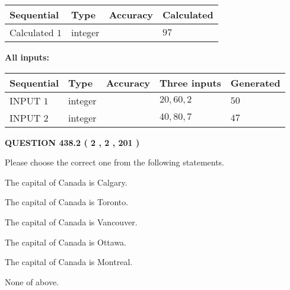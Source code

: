 \documentclass[12pt]{article}
\begin{document}
   
\noindent{}
   
   
  
  
\noindent\begin{tabular}{|l|l|l|l|}
\hline
 Sequential & Type & Accuracy & Calculated \\ 
\hline
 
 
  Calculated $  1 $ & integer &  & 
  $ 97 $ 
 \\  \hline  
 \end{tabular}
   
   
   
   
\noindent\vspace{0.1in}\hspace{-0.08in} {\textbf{\Large{All inputs: }}}
   
   
  
  
\noindent\begin{tabular}{|l|l|l|l|l|}
\hline
 Sequential & Type & Accuracy & Three inputs & Generated \\ 
\hline
 
 
  INPUT $  1 $ & integer &  & $
 20
 , 
 60
 , 
 2
 $ & $ 50 $ 
 \\  \hline  
 
 
  INPUT $  2 $ & integer &  & $
 40
 , 
 80
 , 
 7
 $ & $ 47 $ 
 \\  \hline  
 \end{tabular}
   
   
  
\vspace{0.2in}
  
{\textbf{\Large{QUESTION
438.2 
 ( 2 , 2 , 201 )
}}}
  
  
Please choose the correct one from the following statements.
 
 
The capital of Canada is Calgary.
 
 
The capital of Canada is Toronto.
 
 
The capital of Canada is Vancouver.
 
 
The capital of Canada is Ottawa.
 
 
The capital of Canada is Montreal.
 
 
 None of above.
 
 
\noindent{}
 
\end{document}
